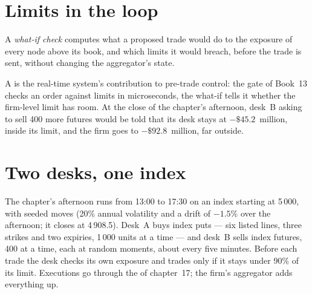 \section{Limits in the loop}

\begin{definition}\label{def:pl:real-time-risk:whatif}
A \emph{what-if check} computes what a proposed trade would do to the exposure of every node above its book, and which
limits it would breach, before the trade is sent, without changing the aggregator's state.
\end{definition}

\label{lst:pl:real-time-risk:whatif}

A  is the real-time system's contribution to pre-trade control: the gate of Book~13 checks an order against limits in
microseconds, the what-if tells it whether the firm-level limit has room. At the close of the chapter's afternoon, desk~B asking to sell 400
more futures would be told that its desk stays at $-\$45.2$~million, inside its limit, and the firm goes to $-\$92.8$~million, far outside.

\section{Two desks, one index}

The chapter's afternoon runs from 13:00 to 17:30 on an index starting at 5\,000, with seeded moves (20\% annual volatility and a drift of
$-1.5\%$ over the afternoon; it closes at 4\,908.5). Desk~A buys index puts --- six listed lines, three strikes and two expiries, 1\,000 units
at a time --- and desk~B sells index futures, 400 at a time, each at random moments, about every five minutes. Before each trade the desk
checks its own exposure and trades only if it stays under 90\% of its limit. Executions go through the  of chapter~17; the
firm's aggregator adds everything up.

